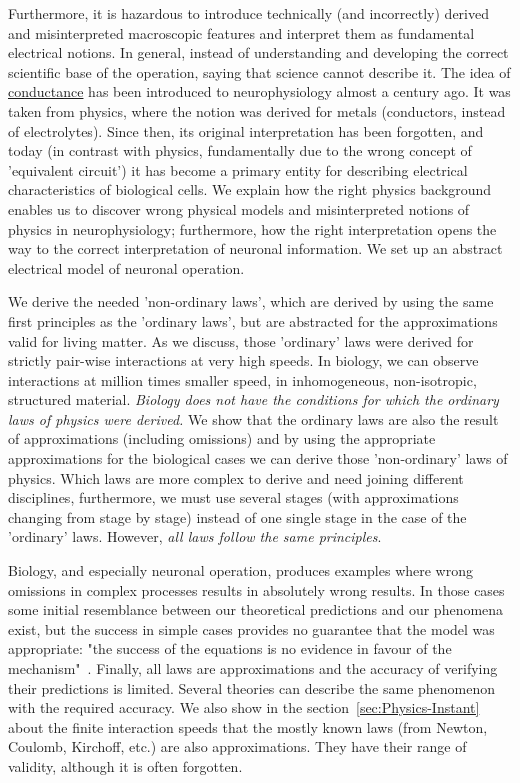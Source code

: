Furthermore, it is hazardous to introduce technically (and incorrectly) derived
and misinterpreted macroscopic features and interpret them as fundamental
electrical notions. In general, instead of understanding and developing the correct scientific base of the operation, saying that science cannot describe it. The idea of
\hyperlink{electric_conductance}
{conductance}
has been introduced
to neurophysiology almost a century ago. It was taken from physics, where the
notion was derived for metals (conductors, instead of electrolytes). Since then, its original interpretation
has been forgotten, and today (in contrast with physics,
 fundamentally due to the wrong concept of 'equivalent circuit') it has become
a primary entity for describing electrical characteristics of biological
cells. We explain how the right physics background enables us to
discover wrong physical models and 
misinterpreted notions of physics in neurophysiology;
furthermore, how the right interpretation opens the way to the correct interpretation
of neuronal information. We set up an abstract electrical model of neuronal
operation.



We derive the needed 'non-ordinary laws', which are derived by using the same first principles as the 'ordinary laws', but are abstracted for the
approximations valid for living matter.
As we discuss, those 'ordinary' laws were derived for strictly pair-wise interactions at very high speeds.
In biology, we can observe interactions at million times smaller speed, in inhomogeneous, non-isotropic, structured material.
\textit{Biology does not have the conditions for which the ordinary laws of physics were derived.}
We show that the ordinary laws are also the result of approximations
(including omissions) and by using the appropriate approximations for the 
biological cases we can derive those 'non-ordinary' laws of physics.
Which laws are more complex to derive and need joining
different disciplines, furthermore, we must use several
stages (with approximations changing from stage by stage) instead of 
one single stage in the case of the 'ordinary' laws. 
However, \textit{all laws follow the same principles}.


Biology, and especially neuronal operation, produces examples where wrong omissions
in complex processes results in absolutely wrong results. In those cases
some initial resemblance between our theoretical predictions and our phenomena exist, but the success
in simple cases provides no guarantee that the model was appropriate: "the success of the equations is no evidence in
favour of the mechanism"~\cite{HodgkinHuxley:1952}.
Finally,
all laws are approximations and the accuracy of verifying their predictions is limited.
Several theories can describe the same phenomenon with the required accuracy.
We also show in the section~\ref{sec:Physics-Instant} about the 
{finite interaction speeds}
 that the mostly known laws (from Newton, Coulomb, Kirchoff, etc.) are
also approximations. They have their range of validity, although it is often
forgotten.

